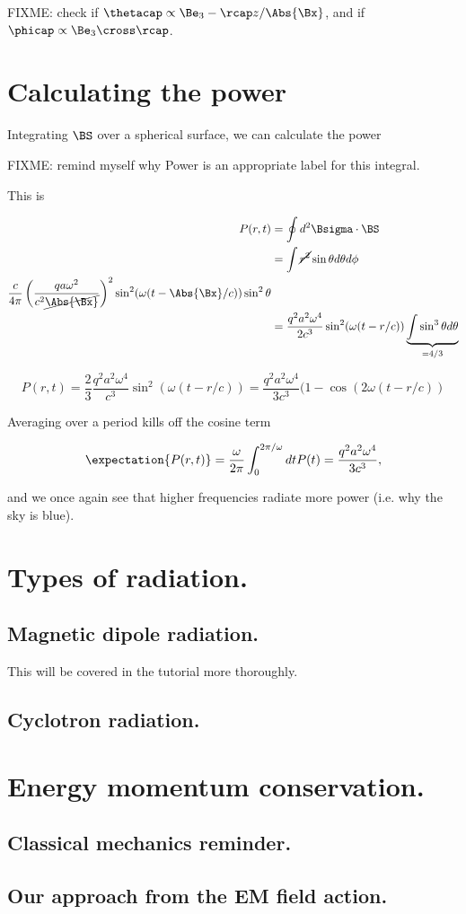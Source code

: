 FIXME: check if $\thetacap \propto \Be_3 - \rcap z/\Abs{\Bx}$, and if $\phicap \propto \Be_3 \cross \rcap$.

\section{Calculating the power}

Integrating $\BS$ over a spherical surface, we can calculate the power

FIXME: remind myself why Power is an appropriate label for this integral.

This is

\begin{align*}
P(r, t)
&= \oint d^2 \Bsigma \cdot \BS \\
&= \int \cancel{r^2} \sin\theta d\theta d\phi \\
\frac{c}{4 \pi}
\left( \frac{q a \omega^2}{c^2 \cancel{\Abs{\Bx}} } \right)^2
\sin^2(\omega (t - \Abs{\Bx}/c)) \sin^2\theta \\
&=
\frac{q^2 a^2 \omega^4}{2 c^3 }
\sin^2(\omega (t - r/c))
\underbrace{\int \sin^3\theta d\theta}_{=4/3}
\end{align*}

\begin{equation}\label{eqn:relativisticElectrodynamicsL21:220}
P(r, t) = \frac{2}{3} \frac{q^2 a^2 \omega^4}{c^3} \sin^2(\omega (t - r/c)) =
\frac{q^2 a^2 \omega^4}{3 c^3} (1 - \cos(2 \omega (t - r/c))
\end{equation}

Averaging over a period kills off the cosine term

\begin{equation}\label{eqn:relativisticElectrodynamicsL21:240}
\expectation{P(r, t)} = \frac{\omega}{2 \pi} \int_0^{2 \pi/\omega} dt P(t) = \frac{q^2 a^2 \omega^4}{3 c^3},
\end{equation}

and we once again see that higher frequencies radiate more power (i.e. why the sky is blue).

\section{Types of radiation.}
\subsection{Magnetic dipole radiation.}

This will be covered in the tutorial more thoroughly.

\subsection{Cyclotron radiation.}

\section{Energy momentum conservation.}
\subsection{Classical mechanics reminder.}
\subsection{Our approach from the EM field action.}

\EndArticle
